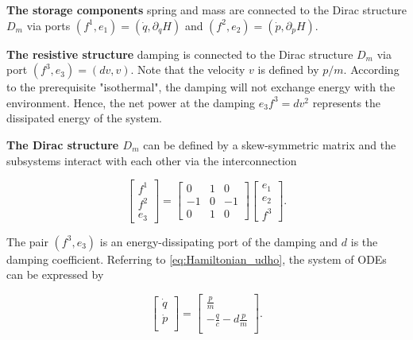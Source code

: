 \documentclass[
	parskip, 			   %
	twoside, 			   %
	DIV=14, 			   %
	BCOR=15.0mm, 		   %
	headsepline, 		   %
	open=right, 		   %
	captions=tableheading, %
	bibliography=totoc,    %
	numbers=noenddot       %
]{scrreprt}
\begin{document}
\textbf{The storage components} spring and mass are connected to the Dirac structure $D_m$ via ports 
$(f^1, e_1) = (\dot{q}, \partial_q H)$ and $(f^2, e_2) = (\dot{p}, \partial_p H)$.

\textbf{The resistive structure} damping is connected to the Dirac structure $D_m$ via port $(f^3, e_3) = (dv, v)$. Note that the velocity $v$ is defined by $p/m$. According to the prerequisite "isothermal", the damping will not exchange energy with the environment. Hence, the net power at the damping $e_3 f^3 = dv^2$ represents the dissipated energy of the system.

\textbf{The Dirac structure $D_m$} can be defined by a skew-symmetric matrix and the subsystems interact with each other via the interconnection

\begin{equation}
    \label{eq:interconnection_idho}
    \left[\begin{array}{c}
    f^1 \\
    f^2 \\
    \hline e_{3}
    \end{array}\right]=\left[\begin{array}{rr|r}
    0 & 1 & 0 \\
    -1 & 0 & -1 \\
    \hline 0 & 1 & 0
    \end{array}\right]\left[\begin{array}{c}
    e_1 \\
    e_2 \\
    \hline f^{3}
    \end{array}\right].
\end{equation}

The pair $(f^3, e_3)$ is an energy-dissipating port of the damping and $d$ is the damping coefficient. Referring to \ref{eq:Hamiltonian_udho}, the system of ODEs can be expressed by

\begin{equation}
    \label{eq:ODE_isothermal_damped_harmonic_oscillator}
    \begin{bmatrix}
    \dot{q}\\
    \dot{p}\\
    \end{bmatrix}
    =
    \begin{bmatrix}
    \frac{p}{m}\\
    -\frac{q}{c}-d\frac{p}{m}\\
    \end{bmatrix}.
\end{equation}
\end{document}
